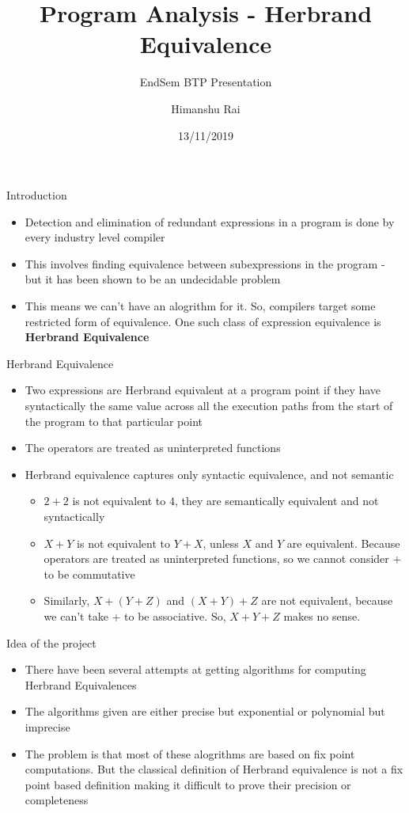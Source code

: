\documentclass[11pt]{beamer}
\title{Program Analysis - Herbrand Equivalence}
\subtitle{EndSem BTP Presentation}
\author{Himanshu Rai}
\institute{Indian Institute of Technology, Palakkad}
\date{13/11/2019}
\begin{document}
\begin{frame}
\titlepage
\end{frame}

\begin{frame}{Introduction}
    \begin{itemize}
        \item Detection and elimination of redundant expressions in a program is done by every industry level compiler
        \item This involves finding equivalence between subexpressions in the program - but it has been shown to be an undecidable problem
        \item This means we can't have an alogrithm for it. So, compilers target some restricted form of equivalence. One such class of expression equivalence is \textbf{Herbrand Equivalence}
    \end{itemize}
\end{frame}

\begin{frame}{Herbrand Equivalence}
    \begin{itemize}
        \item Two expressions are Herbrand equivalent at a program point if they have syntactically the same value across all the execution paths from the start of the program to that particular point
        \item The operators are treated as uninterpreted functions
        \item Herbrand equivalence captures only syntactic equivalence, and not semantic
        \begin{itemize}
            \item $2 + 2$ is not equivalent to $4$, they are semantically equivalent and not syntactically 
            \item $X + Y$ is not equivalent to $Y + X$, unless $X$ and $Y$ are equivalent. Because operators are treated as uninterpreted functions, so we cannot consider $+$ to be commutative
            \item Similarly, $X + (Y + Z)$ and $(X + Y) + Z$ are not equivalent, because we can't take $+$ to be associative. So, $X + Y + Z$ makes no sense.
        \end{itemize}
    \end{itemize}
\end{frame}

\begin{frame}{Idea of the project}
    \begin{itemize}
        \item There have been several attempts at getting algorithms for computing Herbrand Equivalences
        \item The algorithms given are either precise but exponential or polynomial but imprecise
        \item The problem is that most of these alogrithms are based on fix point computations. But the classical definition of Herbrand equivalence is not a fix point based definition making it difficult to prove their precision or completeness 
    \end{itemize}
\end{frame}
\end{document}
